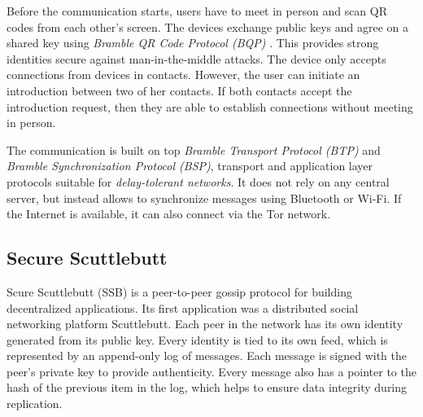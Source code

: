Before the communication starts, users have to meet in person and scan QR codes from each other's screen. The devices exchange public keys and agree on a shared key using \textit{Bramble QR Code Protocol (BQP)} \cite{briar_bqp}.
This provides strong identities secure against man-in-the-middle attacks.
The device only accepts connections from devices in contacts. However, the user can initiate an introduction between two of her contacts. If both contacts accept the introduction request, then they are able to establish connections without meeting in person.

The communication is built on top \textit{Bramble Transport Protocol (BTP)} and \textit{Bramble Synchronization Protocol (BSP)}, transport and application layer protocols suitable for \textit{delay-tolerant networks}. \cite{briar_stack} It does not rely on any central server, but instead allows to synchronize messages using Bluetooth or Wi-Fi. If the Internet is available, it can also connect via the Tor network.


\subsection{Secure Scuttlebutt}

Scure Scuttlebutt (SSB) \cite{ssb} is a peer-to-peer gossip protocol for building decentralized applications. Its first application was a distributed social networking platform Scuttlebutt. Each peer in the network has its own identity generated from its public key. Every identity is tied to its own feed, which is represented by an append-only log of messages. Each message is signed with the peer's private key to provide authenticity. Every message also has a pointer to the hash of the previous item in the log, which helps to ensure data integrity during replication.

